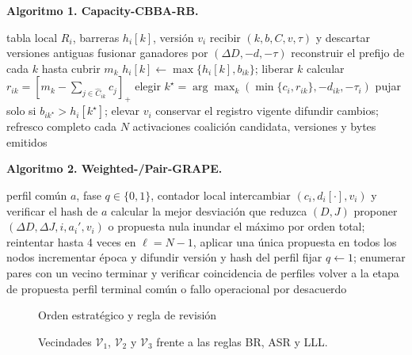 \begin{minipage}[t]{.49\linewidth}
{\scriptsize\textbf{Algoritmo 1. Capacity-CBBA-RB.}\par
\begin{algorithmic}[1]
\Require tabla local $R_i$, barreras $h_i[k]$, versión $v_i$
\State recibir $(k,b,C,v,\tau)$ y descartar versiones antiguas
\State fusionar ganadores por $(\Delta D,-d,-\tau)$
\State reconstruir el prefijo de cada $k$ hasta cubrir $m_k$
  \State $h_i[k]\gets\max\{h_i[k],b_{ik}\}$; liberar $k$
\EndIf
\State calcular $r_{ik}=[m_k-\sum_{j\in\widehat C_{ik}}c_j]_+$
  \State elegir $k^\star=\arg\max_k(\min\{c_i,r_{ik}\},-d_{ik},-\tau_i)$
  \State pujar solo si $b_{ik^\star}>h_i[k^\star]$; elevar $v_i$
\Else
  \State conservar el registro vigente
\EndIf
\State difundir cambios; refresco completo cada $N$ activaciones
\Ensure coalición candidata, versiones y bytes emitidos
\end{algorithmic}}
\end{minipage}\hfill
\begin{minipage}[t]{.49\linewidth}
{\scriptsize\textbf{Algoritmo 2. Weighted-/Pair-GRAPE.}\par
\begin{algorithmic}[1]
\Require perfil común $a$, fase $q\in\{0,1\}$, contador local
\State intercambiar $(c_i,d_i[\cdot],v_i)$ y verificar el hash de $a$
\State calcular la mejor desviación que reduzca $(D,J)$
\State proponer $(\Delta D,\Delta J,i,a_i',v_i)$ o propuesta nula
  \State inundar el máximo por orden total; reintentar hasta 4 veces
\EndFor
\State en $\ell=N-1$, aplicar una única propuesta en todos los nodos
\State incrementar época y difundir versión y hash del perfil
  \State fijar $q\gets1$; enumerar pares con un vecino
  \State terminar y verificar coincidencia de perfiles
\Else
  \State volver a la etapa de propuesta
\EndIf
\Ensure perfil terminal común o fallo operacional por desacuerdo
\end{algorithmic}}
\end{minipage}


\begin{figure}[H]\centering
{}
{Orden estratégico y regla de revisión}
\caption{Vecindades $\mathcal V_1$, $\mathcal V_2$ y $\mathcal V_3$ frente a las
reglas BR, ASR y LLL.}
\end{figure}

